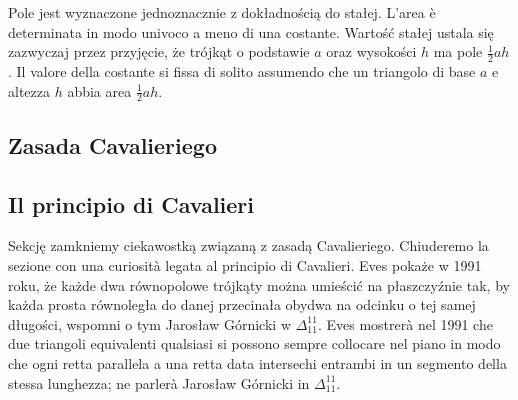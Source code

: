 Pole jest wyznaczone jednoznacznie z dokładnością do stałej. %
L'area è determinata in modo univoco a meno di una costante. %
Wartość stałej ustala się zazwyczaj przez przyjęcie, że trójkąt o podstawie $a$ oraz wysokości $h$ ma pole $\frac 1 2 ah$. %
Il valore della costante si fissa di solito assumendo che un triangolo di base $a$ e altezza $h$ abbia area $\frac 1 2 ah$. %

\subsection{Zasada Cavalieriego} %
\subsection{Il principio di Cavalieri} %

Sekcję zamkniemy ciekawostką związaną z zasadą Cavalieriego. %
Chiuderemo la sezione con una curiosità legata al principio di Cavalieri. %
Eves pokaże w 1991 roku, że każde dwa równopolowe trójkąty można umieścić na płaszczyźnie tak, by każda prosta równoległa do danej przecinała obydwa na odcinku o tej samej długości, wspomni o tym Jarosław Górnicki w $\Delta_{11}^{11}$. %
Eves mostrerà nel 1991 che due triangoli equivalenti qualsiasi si possono sempre collocare nel piano in modo che ogni retta parallela a una retta data intersechi entrambi in un segmento della stessa lunghezza; ne parlerà Jarosław Górnicki in $\Delta_{11}^{11}$. %

%
